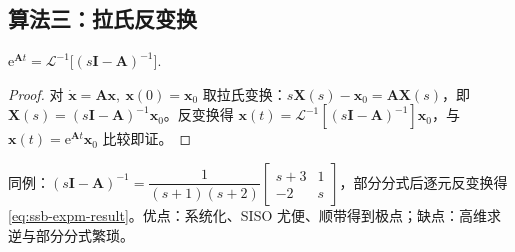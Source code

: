\subsection{算法三：拉氏反变换}
\begin{theorem}[拉氏反变换法]\label{thm:ssb-laplace}
$\displaystyle \mathrm{e}^{\mathbf{A}t}=\mathcal{L}^{-1}\!\big[(s\mathbf{I}-\mathbf{A})^{-1}\big]$.
\end{theorem}
\begin{proof}
对 $\dot{\mathbf{x}}=\mathbf{A}\mathbf{x},\ \mathbf{x}(0)=\mathbf{x}_0$ 取拉氏变换：$s\mathbf{X}(s)-\mathbf{x}_0=\mathbf{A}\mathbf{X}(s)$，即 $\mathbf{X}(s)=(s\mathbf{I}-\mathbf{A})^{-1}\mathbf{x}_0$。反变换得 $\mathbf{x}(t)=\mathcal{L}^{-1}[(s\mathbf{I}-\mathbf{A})^{-1}]\mathbf{x}_0$，与 $\mathbf{x}(t)=\mathrm{e}^{\mathbf{A}t}\mathbf{x}_0$ 比较即证。
\end{proof}
同例：$(s\mathbf{I}-\mathbf{A})^{-1}=\dfrac{1}{(s+1)(s+2)}\begin{bmatrix}s+3&1\\-2&s\end{bmatrix}$，部分分式后逐元反变换得 \cref{eq:ssb-expm-result}。优点：系统化、SISO 尤便、顺带得到极点；缺点：高维求逆与部分分式繁琐。

